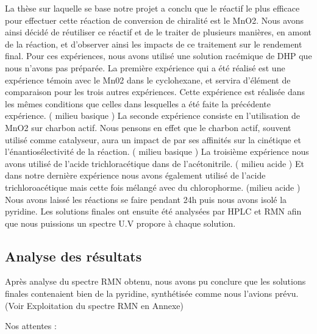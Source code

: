 \documentclass{article}
\begin{document}
La thèse sur laquelle se base notre projet a conclu que le réactif le plus efficace pour effectuer cette réaction de conversion de chiralité est le MnO2. Nous avons ainsi décidé de réutiliser ce réactif et de le traiter de plusieurs manières, en amont de la réaction, et d’observer ainsi les impacts de ce traitement sur le rendement final.
Pour ces expériences, nous avons utilisé une solution racémique de DHP que nous n’avons pas préparée.
\medbreak
La première expérience qui a été réalisé est une expérience témoin avec le Mn02 dans le cyclohexane, et servira d’élément de comparaison pour les trois autres expériences. Cette expérience est réalisée dans les mêmes conditions que celles dans lesquelles a été faite la précédente expérience. ( milieu basique )
 \medbreak
La seconde expérience consiste en l’utilisation de MnO2 sur charbon actif. Nous pensons en effet que le charbon actif, souvent utilisé comme catalyseur, aura un impact de par ses affinités sur la cinétique et l'énantiosélectivité de la réaction. ( milieu basique )
\medbreak
La troisième expérience nous avons utilisé de l’acide trichloracétique dans de l’acétonitrile. ( milieu acide )
Et dans notre dernière expérience nous avons également utilisé de l’acide trichloroacétique mais cette fois mélangé avec du chlorophorme. (milieu acide )
\medbreak
Nous avons laissé les réactions se faire pendant 24h puis nous avons isolé la pyridine.
Les solutions finales ont ensuite été analysées par HPLC et RMN afin que nous puissions un spectre U.V propore à chaque solution.


\subsection{Analyse des résultats}


Après analyse du spectre RMN obtenu, nous avons pu conclure que les solutions finales contenaient bien de la pyridine, synthétisée comme nous l'avions prévu. (Voir Exploitation du spectre RMN en Annexe)























Nos attentes :
\end{document}

